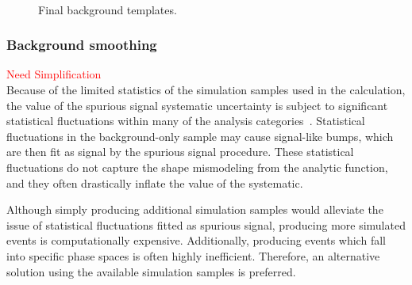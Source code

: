 \begin{figure}[htbp]
   \\
  \caption{Final background templates.}
  \label{fig:BkgData-MC}
\end{figure}
\clearpage


\subsubsection{Background smoothing}
\label{ssec:bkg_smoothing}
\textcolor{red}{Need Simplification} \\
Because of the limited statistics of the simulation samples used in the calculation, the value
of the spurious signal systematic uncertainty is subject to significant statistical fluctuations within
many of the analysis categories~\cite{Hyneman:2712576}. Statistical fluctuations in the background-only sample may cause
signal-like bumps, which are then fit as signal by the spurious signal procedure. These statistical fluctuations do
not capture the shape mismodeling from the analytic function, and they often drastically inflate the
value of the systematic.

Although simply producing additional simulation samples would alleviate the issue of statistical
fluctuations fitted as spurious signal, producing more simulated events is computationally
expensive. Additionally, producing events which fall into specific phase spaces is often highly inefficient. 
Therefore, an alternative solution using the available simulation samples is preferred. 

